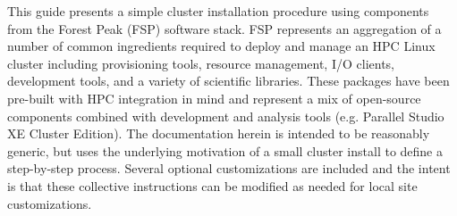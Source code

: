 This guide presents a simple cluster installation procedure using components
from the Forest Peak (FSP) software stack. FSP represents an aggregation of a number of
common ingredients required to deploy and manage an HPC Linux cluster including
provisioning tools, resource management, I/O clients, development tools, and a variety of
scientific libraries. These packages have been pre-built with HPC integration
in mind and represent a mix of open-source components combined with \Intel{}
development and analysis tools (e.g. \Intel{} Parallel Studio XE Cluster Edition).
The documentation herein is intended to be reasonably generic, but uses the
underlying motivation of a small cluster install to define a step-by-step
process. Several optional customizations are included and the intent is that
these collective instructions can be modified as needed for local site
customizations. 
